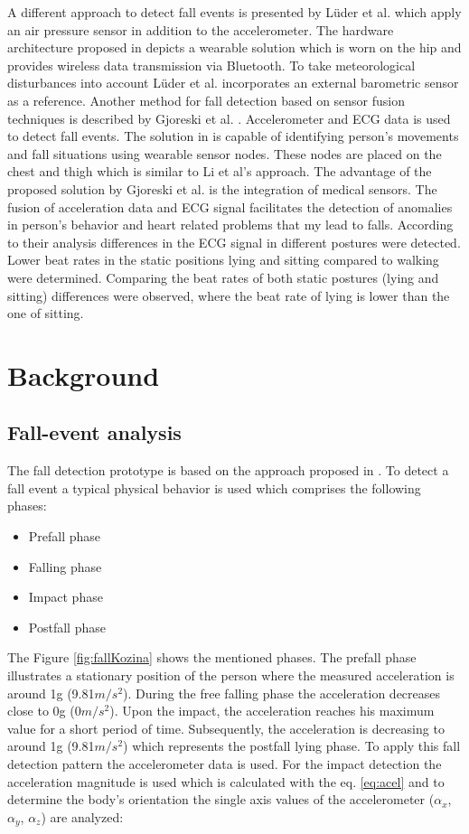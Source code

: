 \documentclass[10pt,journal,compsoc]{IEEEtran}
\begin{document}
A different approach to detect fall events is presented by Lüder et al. \cite{Luder2009} which apply an air pressure sensor in addition to the accelerometer. The hardware architecture proposed in \cite{Luder2009} depicts a wearable solution which is worn on the hip and provides wireless data transmission via Bluetooth. To take meteorological disturbances into account Lüder et al. \cite{Luder2009} incorporates an external barometric sensor as a reference. Another method for fall detection based on sensor fusion techniques is described by Gjoreski et al. \cite{Gjoreski2014}. Accelerometer and ECG data is used to detect fall events. The solution in \cite{Gjoreski2014} is capable of identifying person's movements and fall situations using wearable sensor nodes. These nodes are placed on the chest and thigh which is similar to Li et al's \cite{Li2009} approach. The advantage of the proposed solution by Gjoreski et al. \cite{Gjoreski2014} is the integration of medical sensors. The fusion of acceleration data and ECG signal facilitates the detection of anomalies in person's behavior and heart related problems that my lead to falls. According to their analysis differences in the ECG signal in different postures were detected. Lower beat rates in the static positions lying and sitting compared to walking were determined. Comparing the beat rates of both static postures (lying and sitting) differences were observed, where the beat rate of lying is lower than the one of sitting.

\section{Background}
\label{sec:background}

\subsection{Fall-event analysis}
\label{subsec:fall-analysis}
The fall detection prototype is based on the approach proposed in \cite{Gjoreski2014, Kozina}. To detect a fall event a typical physical behavior is used which comprises the following phases:
\begin{itemize}
	\item Prefall phase 
	\item Falling phase
	\item Impact phase
	\item Postfall phase
\end{itemize}
The Figure \ref{fig:fallKozina} shows the mentioned phases. The prefall phase illustrates a stationary position of the person where the measured acceleration is around 1g (9.81$m/s^{2}$). During the free falling phase the  acceleration decreases close to 0g (0$m/s^{2}$). Upon the impact, the acceleration reaches his maximum value for a short period of time. Subsequently, the acceleration is decreasing to around 1g (9.81$m/s^{2}$) which represents the postfall lying phase. To apply this fall detection pattern the accelerometer data is used. For the impact detection the acceleration magnitude is used which is calculated with the eq. \ref{eq:acel} and to determine the body's orientation the single axis values of the accelerometer ($\alpha_x$, $\alpha_y$, $\alpha_z$) are analyzed:
\end{document}

